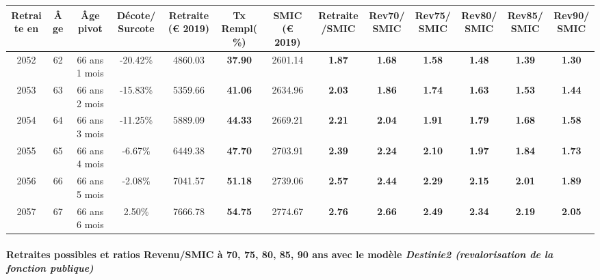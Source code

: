 { \scriptsize \begin{center} 
\begin{tabular}[htb]{|c|c||c|c||c|c||c||c|c|c|c|c|c|} 
\hline 
 Retraite en &  Âge &  Âge pivot &  Décote/Surcote &  Retraite (\euro{} 2019) &  Tx Rempl(\%) &  SMIC (\euro{} 2019) &  Retraite/SMIC &  Rev70/SMIC &  Rev75/SMIC &  Rev80/SMIC &  Rev85/SMIC &  Rev90/SMIC \\ 
\hline \hline 
 2052 &  62 &  66 ans 1 mois &  -20.42\% &  4860.03 &  {\bf 37.90} &  2601.14 &  {\bf 1.87} &  {\bf 1.68} &  {\bf 1.58} &  {\bf 1.48} &  {\bf 1.39} &  {\bf 1.30} \\ 
\hline 
 2053 &  63 &  66 ans 2 mois &  -15.83\% &  5359.66 &  {\bf 41.06} &  2634.96 &  {\bf 2.03} &  {\bf 1.86} &  {\bf 1.74} &  {\bf 1.63} &  {\bf 1.53} &  {\bf 1.44} \\ 
\hline 
 2054 &  64 &  66 ans 3 mois &  -11.25\% &  5889.09 &  {\bf 44.33} &  2669.21 &  {\bf 2.21} &  {\bf 2.04} &  {\bf 1.91} &  {\bf 1.79} &  {\bf 1.68} &  {\bf 1.58} \\ 
\hline 
 2055 &  65 &  66 ans 4 mois &  -6.67\% &  6449.38 &  {\bf 47.70} &  2703.91 &  {\bf 2.39} &  {\bf 2.24} &  {\bf 2.10} &  {\bf 1.97} &  {\bf 1.84} &  {\bf 1.73} \\ 
\hline 
 2056 &  66 &  66 ans 5 mois &  -2.08\% &  7041.57 &  {\bf 51.18} &  2739.06 &  {\bf 2.57} &  {\bf 2.44} &  {\bf 2.29} &  {\bf 2.15} &  {\bf 2.01} &  {\bf 1.89} \\ 
\hline 
 2057 &  67 &  66 ans 6 mois &  2.50\% &  7666.78 &  {\bf 54.75} &  2774.67 &  {\bf 2.76} &  {\bf 2.66} &  {\bf 2.49} &  {\bf 2.34} &  {\bf 2.19} &  {\bf 2.05} \\ 
\hline 
\hline 
\end{tabular} 
\end{center} } 
\paragraph{Retraites possibles et ratios Revenu/SMIC à 70, 75, 80, 85, 90 ans avec le modèle \emph{Destinie2 (revalorisation de la fonction publique)}}  
 
